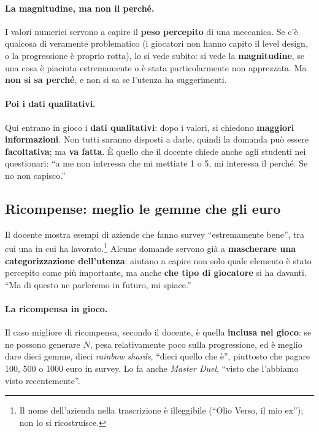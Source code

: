 \paragraph{La magnitudine, ma non il perché.} I valori numerici servono a
capire il \textbf{peso percepito} di una meccanica. Se c'è qualcosa di
veramente problematico (i giocatori non hanno capito il level design, o la
progressione è proprio rotta), lo si vede subito: si vede la
\textbf{magnitudine}, se una cosa è piaciuta estremamente o è stata
particolarmente non apprezzata. Ma \textbf{non si sa perché}, e non si sa se
l'utenza ha suggerimenti.

\paragraph{Poi i dati qualitativi.} Qui entrano in gioco i \textbf{dati
qualitativi}: dopo i valori, si chiedono \textbf{maggiori informazioni}. Non
tutti saranno disposti a darle, quindi la domanda può essere
\textbf{facoltativa}; ma \textbf{va fatta}. È quello che il docente chiede
anche agli studenti nei questionari: ``a me non interessa che mi mettiate 1
o 5, mi interessa il perché. Se no non capisco.''

\subsection{Ricompense: meglio le gemme che gli euro}

Il docente mostra esempi di aziende che fanno survey ``estremamente
bene'', tra cui una in cui ha lavorato.\footnote{Il nome dell'azienda nella
trascrizione è illeggibile (``Olio Verso, il mio ex''); non lo si ricostruisce.}
Alcune domande servono già a \textbf{mascherare una categorizzazione
dell'utenza}: aiutano a capire non solo quale elemento è stato percepito
come più importante, ma anche \textbf{che tipo di giocatore} si ha davanti.
``Ma di questo ne parleremo in futuro, mi spiace.''

\paragraph{La ricompensa in gioco.} Il caso migliore di ricompensa, secondo
il docente, è quella \textbf{inclusa nel gioco}: se ne possono generare $N$,
pesa relativamente poco sulla progressione, ed è meglio dare dieci gemme,
dieci \emph{rainbow shards}, ``dieci quello che è'', piuttosto che pagare
100, 500 o 1000 euro in survey. Lo fa anche \emph{Master Duel}, ``visto che
l'abbiamo visto recentemente''.

